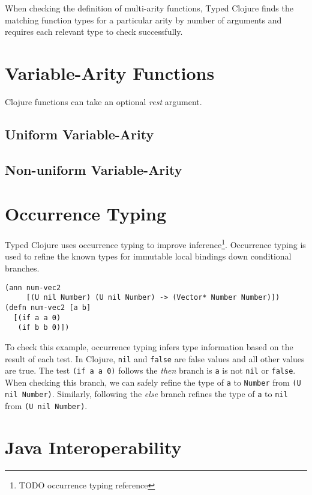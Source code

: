 \documentclass{cshonours}
\begin{document}
When checking the definition of multi-arity functions, Typed Clojure
finds the matching function types for a particular arity by number of arguments
and requires each relevant type to check successfully.

\section{Variable-Arity Functions}

Clojure functions can take an optional \emph{rest} argument.

\subsection{Uniform Variable-Arity}

\subsection{Non-uniform Variable-Arity}

\section{Occurrence Typing}

Typed Clojure uses occurrence typing to improve inference\footnote{TODO occurrence typing reference}.
Occurrence typing is used to refine the known types for immutable local bindings 
down conditional branches.

\begin{lstlisting}
(ann num-vec2 
     [(U nil Number) (U nil Number) -> (Vector* Number Number)])
(defn num-vec2 [a b]
  [(if a a 0) 
   (if b b 0)])
\end{lstlisting}

To check this example, occurrence typing infers type information based on the result of each test.
In Clojure, \lstinline|nil| and \lstinline|false| are false values and all other values are true.
The test \lstinline|(if a a 0)| follows the \emph{then} branch is \lstinline|a| is not \lstinline|nil|
or \lstinline|false|. When checking this branch, we can safely refine the type of \lstinline|a| to \lstinline|Number| from
\lstinline|(U nil Number)|. Similarly, following the \emph{else} branch refines the type of \lstinline|a|
to \lstinline|nil| from \lstinline|(U nil Number)|.

\section{Java Interoperability}
\end{document}
